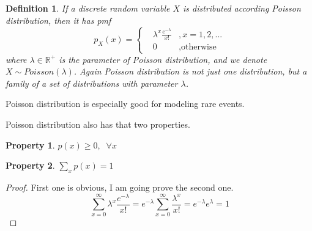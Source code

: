 \documentclass{article}
\newtheorem{definition}{Definition}
\newtheorem{property}{Property}
\begin{document}
\begin{definition}
	If a discrete random variable $X$ is distributed according Poisson distribution, then it has pmf
	\[ p_X(x) = \left\{  \begin{matrix}
	&\lambda^x \frac{e^{-\lambda}}{x!} &,x=1,2,...\\ 
	&0 &,\text{otherwise}
	\end{matrix} \right. \]
	where $\lambda\in\mathbb{R}^+$ is the parameter of Poisson distribution, and we denote $X\sim Poisson(\lambda)$. Again Poisson distribution is not just one distribution, but a family of a set of distributions with parameter $\lambda$. 
\end{definition}

Poisson distribution is especially good for modeling rare events.

Poisson distribution also has that two properties.
\begin{property}
	$p(x) \geq 0,\;\;\forall x$
\end{property}
\begin{property}
	$\sum_x p(x) = 1 $
\end{property} 
\begin{proof}
	First one is obvious, I am going prove the second one.
	\[\sum_{x=0}^\infty \lambda^x \frac{e^{-\lambda}}{x!} = e^{-\lambda} \sum_{x=0}^\infty \frac{\lambda^x}{x!} = e^{-\lambda}e^{\lambda} =1 \]
\end{proof}
\end{document}
